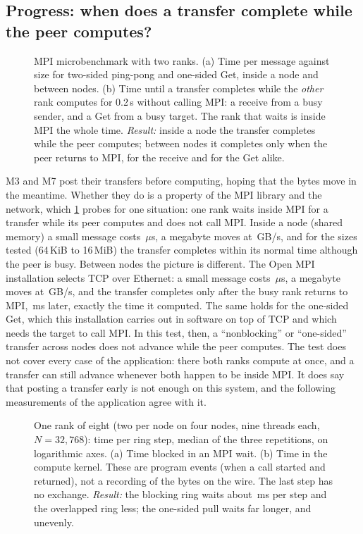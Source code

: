 \subsection{Progress: when does a transfer complete while the peer computes?}\label{sec:progress}
\begin{figure}[t]
\centering
{}
\caption{MPI microbenchmark with two ranks. (a) Time per message against size for
two-sided ping-pong and one-sided Get, inside a node and between nodes. (b) Time
until a transfer completes while the \emph{other} rank computes for 0.2\,s without
calling MPI: a receive from a busy sender, and a Get from a busy target. The rank
that waits is inside MPI the whole time. \emph{Result:} inside a node the transfer
completes while the peer computes; between nodes it completes only when the peer
returns to MPI, for the receive and for the Get alike.}
\label{fig:netbench}
\end{figure}

M3 and M7 post their transfers before computing, hoping that the bytes move in the
meantime. Whether they do is a property of the MPI library and the network, which
\cref{fig:netbench} probes for one situation: one rank waits inside MPI for a
transfer while its peer computes and does not call MPI. Inside a node (shared
memory) a small message costs \,$\mu$s, a megabyte moves at
\,GB/s, and for the sizes tested (64\,KiB to 16\,MiB) the
transfer completes within its normal time although the peer is busy. Between nodes
the picture is different. The Open MPI installation selects TCP over Ethernet: a
small message costs \,$\mu$s, a megabyte moves at
\,GB/s, and the transfer completes only after the busy rank
returns to MPI, \,ms later, exactly the time it computed. The same
holds for the one-sided Get, which this installation carries out in software on
top of TCP and which needs the target to call MPI. In this test, then, a
``nonblocking'' or ``one-sided'' transfer across nodes does not advance while the
peer computes. The test does not cover every case of the application: there both
ranks compute at once, and a transfer can still advance whenever both happen to
be inside MPI. It does say that posting a transfer early is not enough on this
system, and the following measurements of the application agree with it.

\begin{figure}[t]
\centering
{}
\caption{One rank of eight (two per node on four nodes, nine threads each,
$N=32{,}768$): time per ring step, median of the three repetitions, on logarithmic
axes. (a) Time blocked in an MPI wait. (b) Time in the compute kernel. These are
program events (when a call started and returned), not a recording of the bytes
on the wire. The last step has no exchange. \emph{Result:} the blocking ring waits
about \,ms per step and the overlapped ring less; the
one-sided pull waits far longer, and unevenly.}
\label{fig:traces}
\end{figure}

